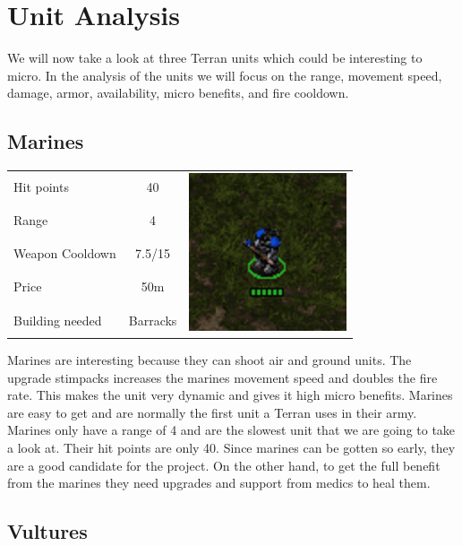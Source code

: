 \section{Unit Analysis}
We will now take a look at three Terran units which could be interesting to micro. In the analysis of the units we will
focus on the range, movement speed, damage, armor, availability, micro benefits, and fire cooldown. 

\subsection{Marines}
\begin{table}[H]
	\begin{tabular}{| l | c | c}
		\cline{1-2}	
		Hit points		& 40		&\multirow{5}{*}{\includegraphics[scale=.4]
									{Figures/Units/marine.png}} \\ \cline{1-2}
		Range			& 4 		&\\ \cline{1-2}
		Weapon Cooldown	& 7.5/15 	&\\ \cline{1-2}
		Price			& 50m		&\\ \cline{1-2}
		Building needed	& Barracks	&\\ \cline{1-2}
	\end{tabular}
\end{table}

Marines are interesting because they can shoot air and ground units. The upgrade stimpacks increases the marines movement speed and doubles the fire rate. This makes the unit very dynamic and gives it high micro benefits. Marines are easy to get and are normally the first unit a Terran uses in
their army. Marines only have a range of 4 and are the slowest unit that we are going to take a look at. Their
hit points are only 40. Since marines can be gotten so early, they are a good candidate for the project. On the other hand, to get the full benefit from the marines they need upgrades and support from medics to heal them. 

\subsection{Vultures}


